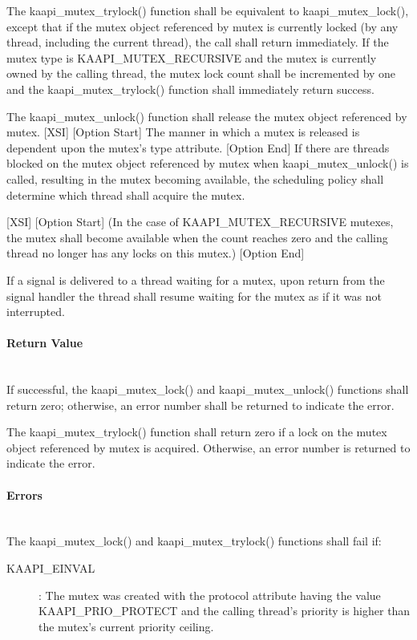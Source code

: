 \begin{description}
The kaapi\_mutex\_trylock() function shall be equivalent to
kaapi\_mutex\_lock(), except that if the mutex object referenced by mutex is
currently locked (by any thread, including the current thread), the call shall
return immediately. If the mutex type is KAAPI\_MUTEX\_RECURSIVE and the mutex
is currently owned by the calling thread, the mutex lock count shall be
incremented by one and the kaapi\_mutex\_trylock() function shall immediately
return success.

The kaapi\_mutex\_unlock() function shall release the mutex object referenced
by mutex. [XSI] [Option Start] The manner in which a mutex is released is
dependent upon the mutex's type attribute. [Option End] If there are threads
blocked on the mutex object referenced by mutex when kaapi\_mutex\_unlock() is
called, resulting in the mutex becoming available, the scheduling policy shall
determine which thread shall acquire the mutex.

[XSI] [Option Start] (In the case of KAAPI\_MUTEX\_RECURSIVE mutexes, the
mutex shall become available when the count reaches zero and the calling
thread no longer has any locks on this mutex.) [Option End]

If a signal is delivered to a thread waiting for a mutex, upon return from the
signal handler the thread shall resume waiting for the mutex as if it was not
interrupted.

\paragraph{Return Value}~\\
If successful, the kaapi\_mutex\_lock() and kaapi\_mutex\_unlock() functions
shall return zero; otherwise, an error number shall be returned to indicate
the error.

The kaapi\_mutex\_trylock() function shall return zero if a lock on the mutex
object referenced by mutex is acquired. Otherwise, an error number is returned
to indicate the error.

\paragraph{Errors}~\\
The kaapi\_mutex\_lock() and kaapi\_mutex\_trylock() functions shall fail if:

\begin{description}
\item [KAAPI\_EINVAL]: The mutex was created with the protocol attribute
  having the value KAAPI\_PRIO\_PROTECT and the calling thread's priority is
  higher than the mutex's current priority ceiling.
\end{description}


\end{description}
